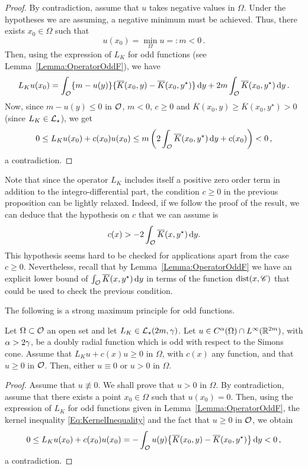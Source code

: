 \begin{proof}
By contradiction, assume that $u$ takes negative values in $\Omega$. Under the hypotheses we are assuming, a negative minimum must be achieved. Thus, there exists $x_0\in \Omega$ such that
$$
u(x_0) = \min_{\Omega} u =: m < 0\,.
$$
Then, using the expression of $L_K$ for odd functions (see Lemma~\ref{Lemma:OperatorOddF}), we have
$$
L_K u (x_0) = \int_{\mathcal{O}} \{m - u(y) \} \{\overline{K}(x_0, y) - \overline{K}(x_0, y^\star)  \} \,\mathrm{d} y +  2 m \int_{\mathcal{O}} \overline{K}(x_0, y^\star) \,\mathrm{d} y\,.
$$
Now, since $m - u(y) \leq 0$ in $\mathcal{O}$, $m<0$, $c\geq 0$ and $\overline{K}(x_0, y) \geq \overline{K}(x_0, y^\star)>0$ (since $L_K\in \mathcal{L}_\star$), we get
$$
0 \leq L_K  u(x_0) + c(x_0) u(x_0) \leq m \left(2\int_{\mathcal{O}} \overline{K}(x_0, y^\star) \,\mathrm{d} y + c(x_0)\right)  < 0\,,
$$
a contradiction.
\end{proof}

\begin{remark}
Note that since the operator $L_K$ includes itself a positive zero order term in addition to the integro-differential part, the condition $c\geq 0$ in the previous proposition can be lightly relaxed. Indeed, if we follow the proof of the result, we can deduce that the hypothesis on $c$ that we can assume is 
$$ c(x) > -2\int_{\mathcal{O}} \overline{K}(x, y^\star) \,\mathrm{d} y. $$
This hypothesis seems hard to be checked for applications apart from the case $c\geq 0$. Nevertheless, recall that by Lemma~\ref{Lemma:OperatorOddF} we have an explicit lower bound of $ \int_{\mathcal{O}} \overline{K}(x, y^\star) \,\mathrm{d} y $ in terms of the function $\operatorname{dist}(x,\mathscr{C})$ that could be used to check the previous condition.
\end{remark}

The following is a strong maximum principle for odd functions.

\begin{proposition}
\label{Prop:StrongMaximumPrincipleForOddFunctions} Let $\Omega \subset \mathcal{O}$ an open set and let $L_K  \in \mathcal{L}_\star (2m,  \gamma)$.  Let $u\in C^{\alpha}(\Omega)\cap L^\infty(\mathbb{R}^{2m})$, with $\alpha > 2\gamma$, be a doubly radial function which is odd with respect to the Simons cone. Assume that $L_K u + c(x) u\geq 0$ in $\Omega$, with $c(x)$ any function, and that $u\geq 0$ in $\mathcal{O}$. Then, either $u\equiv 0$ or $u > 0$ in $\Omega$.
\end{proposition}

\begin{proof}
Assume that $u \not \equiv 0$. We shall prove that $u > 0$ in $\Omega$. By contradiction, assume that there exists a point $x_0\in \Omega$ such that $u(x_0)= 0$. Then, using the expression of $L_K $ for odd functions given in Lemma~\ref{Lemma:OperatorOddF}, the kernel inequality \eqref{Eq:KernelInequality} and the fact that $u\geq 0$ in $\mathcal{O}$, we obtain
$$
0 \leq L_K u(x_0) + c(x_0) u(x_0) = - \int_{\mathcal{O}} u(y)\big \{\overline{K}(x_0, y) - \overline{K}(x_0, y^\star) \big \}\,\mathrm{d} y < 0\,,
$$
a contradiction.
\end{proof}


